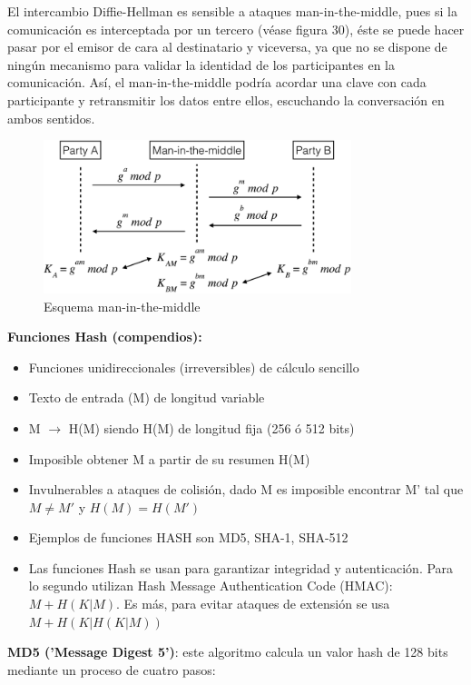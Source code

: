 \documentclass[a4paper,11pt]{article}
\begin{document}
El intercambio Diffie-Hellman es sensible a ataques man-in-the-middle, pues si la comunicación es interceptada por un tercero (véase figura 30), éste se puede hacer pasar por el emisor de cara al destinatario y viceversa, ya que no se dispone de ningún mecanismo para validar la identidad de los participantes en la comunicación. Así, el man-in-the-middle podría acordar una clave con cada participante y retransmitir los datos entre ellos, escuchando la conversación en ambos sentidos.

\begin{figure}[h]
\centering
\caption{Esquema man-in-the-middle}
\includegraphics[scale=1,width=0.8\textwidth]{esquema_man-in-the-middle.png}
\end{figure}

\textbf{Funciones Hash (compendios):} 

\begin{itemize}
\item Funciones unidireccionales (irreversibles) de cálculo sencillo
\item Texto de entrada (M) de longitud variable
\item M $\rightarrow$ H(M) siendo H(M) de longitud fija (256 ó 512 bits)
\item Imposible obtener M a partir de su resumen H(M)
\item Invulnerables a ataques de colisión, dado M es imposible encontrar M' tal que $M \neq M'$ y $H(M)=H(M')$
\item Ejemplos de funciones HASH son MD5, SHA-1, SHA-512
\item Las funciones Hash se usan para garantizar integridad y autenticación. Para lo segundo utilizan Hash Message Authentication Code (HMAC):$M+H(K|M)$. Es más, para evitar ataques de extensión se usa $M+H(K|H(K|M))$
\end{itemize}

\textbf{MD5 ('Message Digest 5')}: este algoritmo calcula un valor hash de 128 bits mediante un proceso de cuatro pasos:
\end{document}
